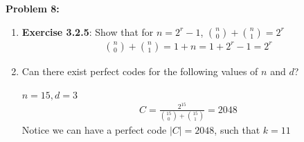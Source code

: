 \documentclass[11pt]{article}
\newenvironment{problem}[1]{\textbf{Problem #1: }}{\newpage}
\begin{document}
	\begin{problem}{8}
		\begin{enumerate}[label = (\alph*)]
			\item \textbf{Exercise 3.2.5}: 
			Show that for $n = 2^r - 1$, $\binom{n}{0} + \binom{n}{1} = 2^r$
			\begin{align*}
				\binom{n}{0} + \binom{n}{1} = 1 + n = 1 + 2^r - 1 = 2^r
			\end{align*}
			\item Can there exist perfect codes for the following values of $n$ and $d$?
			\\ \\
			$n = 15, d = 3$
			\begin{align*}
				C = \frac{2^{15}}{\binom{15}{0} + \binom{15}{1}} = 2048 
			\end{align*}
			Notice we can have a perfect code $|C| = 2048$, such that $k = 11$
		\end{enumerate}
	\end{problem}
\end{document}

